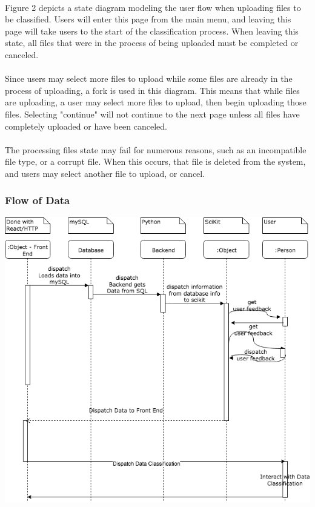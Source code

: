 \documentclass[12pt,oneside,letterpaper]{article}
\begin{document}
\paragraph{} Figure 2 depicts a state diagram modeling the user flow when uploading files to be classified. Users will enter this page from the main menu, and leaving this page will take users to the start of the classification process. When leaving this state, all files that were in the process of being uploaded must be completed or canceled.
\paragraph{} Since users may select more files to upload while some files are already in the process of uploading, a fork is used in this diagram. This means that while files are uploading, a user may select more files to upload, then begin uploading those files. Selecting "continue" will not continue to the next page unless all files have completely uploaded or have been canceled.
\paragraph{} The processing files state may fail for numerous reasons, such as an incompatible file type, or a corrupt file. When this occurs, that file is deleted from the system, and users may select another file to upload, or cancel.

\subsubsection{Flow of Data}
\includegraphics[scale = 0.52]{YarmSequenceDiagram.png}
\begingroup
{}
\endgroup
\end{document}
